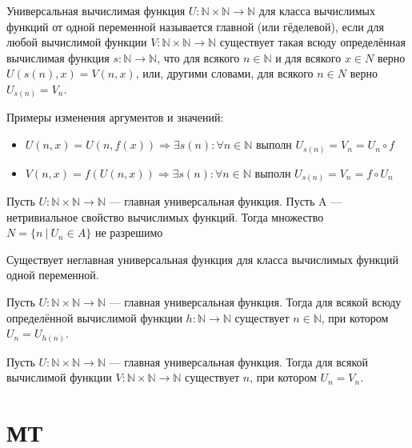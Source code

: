 \documentclass{article}
\newcommand{\then}{\Rightarrow}
\newcommand{\N}{\mathbb{N}}
\newenvironment{theorem}[2][Теорема]{\begin{trivlist}
\item[\hskip \labelsep {\bfseries #1}\hskip \labelsep {\bfseries #2.}]}{\end{trivlist}}
\newenvironment{definition}[2][Определение]{\begin{trivlist}
\item[\hskip \labelsep {\bfseries #1}\hskip \labelsep {\bfseries #2}]}{\end{trivlist}}
\begin{document}
\begin{definition}{УВФ}
Универсальная вычислимая функция $U : \N \times \N \to \N$ для класса вычислимых функций от одной переменной называется главной (или гёделевой),
если для любой вычислимой функции $V : \N \times \N \to \N$ существует такая всюду определённая вычислимая функция $s: \N \to \N$, что для всякого $n \in \N$ и для всякого
$x \in N$ верно $U(s(n), x) = V (n, x)$, или, другими словами, для всякого $n \in N$ верно
$U_{s(n)} = V_n$.

Примеры изменения аргументов и значений:
\begin{itemize}
\item $U(n, x) = U(n, f(x)) \then \exists s(n) : \forall n \in \N \text{ выполн } U_{s(n)} = V_n = U_n \circ f$
\item $V(n, x) = f(U(n, x)) \then \exists s(n) : \forall n \in \N \text{ выполн } U_{s(n)} = V_n = f \circ U_n$
\end{itemize}
\end{definition}

\begin{theorem}{Райса – Успенского}
Пусть $U : \N \times \N \to \N$ — главная универсальная функция. Пусть A — нетривиальное свойство вычислимых функций.
Тогда множество
$
N = \{n~|~ U_n \in A\}
$
не разрешимо
\end{theorem}

\begin{theorem}{Неглавная УФ}
Существует неглавная универсальная функция для класса вычислимых функций одной переменной.
\end{theorem}


\begin{theorem}{Неподвижная точка}
Пусть $U : \N \times \N \to \N$ — главная универсальная функция. Тогда для
всякой всюду определённой вычислимой функции $h: \N \to \N$ существует $n \in \N$, при
котором $U_n = U_{h(n)}$.
\end{theorem}

\begin{definition}{Следствие из неп точки.}
Пусть $U : \N\times\N \to \N$ — главная универсальная функция. Тогда для
всякой вычислимой функции $V : \N \times \N \to \N$ существует $n$, при котором $U_n = V_n$.
\end{definition}

\section{МТ}
\end{document}
